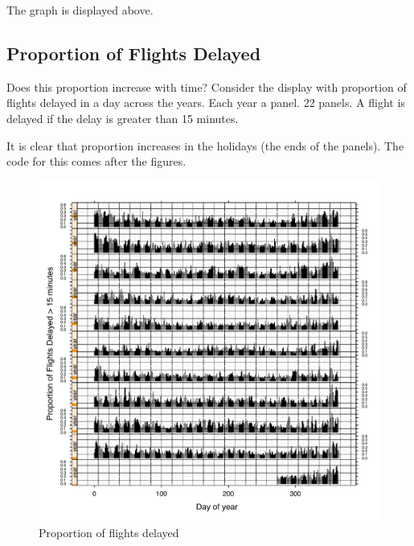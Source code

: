 \documentclass[letterpaper,10pt,english]{sphinxmanual}
\begin{document}
The graph is displayed above.


\subsection{Proportion of Flights Delayed}
\label{airline:proportion-of-flights-delayed}
Does this proportion increase with time? Consider the display with proportion of
flights delayed in a day across the years. Each year a panel. 22 panels. A
flight is delayed if the delay is greater than 15 minutes.

It is clear that proportion increases in the holidays (the ends of the
panels). The code for this comes after the figures.
\begin{figure}[htbp]
\centering
\capstart

\includegraphics{propdelayed_1.pdf}
\caption{Proportion of flights delayed}\end{figure}
\end{document}
